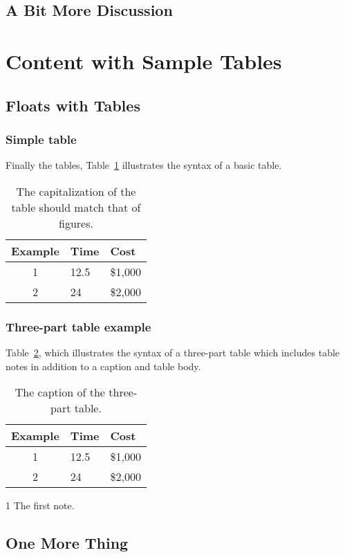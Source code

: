 \subsection{A Bit More Discussion}
\lipsum[16-19]

\section{Content with Sample Tables}

\lipsum[15]

\subsection{Floats with Tables}

\lipsum[16]

\subsubsection{Simple table}

Finally the tables, Table~\ref{tbl:tbl01} illustrates the syntax of a
basic table. %
\begin{table}[tb]
  \caption{The capitalization of the table should match that of figures.}
  \label{tbl:tbl01}
  \begin{center}
  \begin{tabular}{c l l}
  \hline
  Example & Time & Cost \\
  \hline
  1 & 12.5 & \$1,000 \\
  2 & 24 & \$2,000 \\
  \hline
  \end{tabular}
  \end{center}
\end{table}
\lipsum[16-18]

\subsubsection{Three-part table example}

Table~\ref{tbl:tbl02}, which illustrates the syntax of a three-part
table which includes table notes in addition to a caption and table
body.
\begin{table}[tb]
\begin{threeparttable}
  \caption{The caption of the three-part table.}
  \label{tbl:tbl02}
  \begin{center}
\begin{tabular*}{\textwidth}{c l l} %
  \hline
  Example & Time\tnote{1} & Cost \\
  \hline
  1 & 12.5 & \$1,000 \\
  2 & 24 & \$2,000 \\
  \hline
\end{tabular*}
\begin{tablenotes}
  \item [1] The first note.
\end{tablenotes}
  \end{center}
\end{threeparttable}
\end{table}
\lipsum[19-21]

\subsection{One More Thing}
\lipsum[22-25]

\endinput
